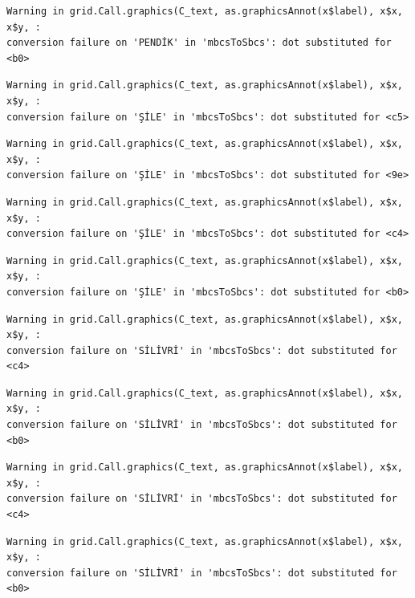 \documentclass[
  11pt,
  a4paper,
  DIV=11,
  numbers=noendperiod]{scrartcl}
\begin{document}
\begin{verbatim}
Warning in grid.Call.graphics(C_text, as.graphicsAnnot(x$label), x$x, x$y, :
conversion failure on 'PENDİK' in 'mbcsToSbcs': dot substituted for <b0>
\end{verbatim}

\begin{verbatim}
Warning in grid.Call.graphics(C_text, as.graphicsAnnot(x$label), x$x, x$y, :
conversion failure on 'ŞİLE' in 'mbcsToSbcs': dot substituted for <c5>
\end{verbatim}

\begin{verbatim}
Warning in grid.Call.graphics(C_text, as.graphicsAnnot(x$label), x$x, x$y, :
conversion failure on 'ŞİLE' in 'mbcsToSbcs': dot substituted for <9e>
\end{verbatim}

\begin{verbatim}
Warning in grid.Call.graphics(C_text, as.graphicsAnnot(x$label), x$x, x$y, :
conversion failure on 'ŞİLE' in 'mbcsToSbcs': dot substituted for <c4>
\end{verbatim}

\begin{verbatim}
Warning in grid.Call.graphics(C_text, as.graphicsAnnot(x$label), x$x, x$y, :
conversion failure on 'ŞİLE' in 'mbcsToSbcs': dot substituted for <b0>
\end{verbatim}

\begin{verbatim}
Warning in grid.Call.graphics(C_text, as.graphicsAnnot(x$label), x$x, x$y, :
conversion failure on 'SİLİVRİ' in 'mbcsToSbcs': dot substituted for <c4>
\end{verbatim}

\begin{verbatim}
Warning in grid.Call.graphics(C_text, as.graphicsAnnot(x$label), x$x, x$y, :
conversion failure on 'SİLİVRİ' in 'mbcsToSbcs': dot substituted for <b0>
\end{verbatim}

\begin{verbatim}
Warning in grid.Call.graphics(C_text, as.graphicsAnnot(x$label), x$x, x$y, :
conversion failure on 'SİLİVRİ' in 'mbcsToSbcs': dot substituted for <c4>
\end{verbatim}

\begin{verbatim}
Warning in grid.Call.graphics(C_text, as.graphicsAnnot(x$label), x$x, x$y, :
conversion failure on 'SİLİVRİ' in 'mbcsToSbcs': dot substituted for <b0>
\end{verbatim}
\end{document}
